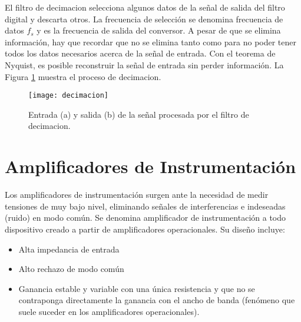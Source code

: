 El filtro de decimacion selecciona algunos datos de la señal de salida del filtro digital y descarta otros. La frecuencia de selección se denomina frecuencia de datos $f_s$ y es la frecuencia de salida del conversor. A pesar de que se elimina información, hay que recordar que no se elimina tanto como para no poder tener todos los datos necesarios acerca de la señal de entrada. Con el teorema de Nyquist\cite{shannon}, es posible reconstruir la señal de entrada sin perder información. La Figura \ref{fig:decimacion} muestra el proceso de decimacion.\cite{delta_sigma_2} %

\begin{figure}[h]
  \centering
  \texttt{[image: decimacion]}
  \caption{Entrada (a) y salida (b) de la señal procesada por el filtro de decimacion. }\label{fig:decimacion}
\end{figure} 




\section{Amplificadores de Instrumentación} %
\label{sec:amplificadores_de_instrumentacion}


Los amplificadores de instrumentación surgen ante la necesidad de medir tensiones de muy bajo nivel, eliminando señales de interferencias e indeseadas (ruido) en modo común.
Se denomina amplificador de instrumentación a todo dispositivo creado a partir de amplificadores operacionales. Su diseño incluye:

\begin{itemize}
  \item Alta impedancia de entrada
    \item Alto rechazo de modo común
    \item Ganancia estable y variable con una única resistencia y que no se contraponga directamente la ganancia con el ancho de banda (fenómeno que suele suceder en los amplificadores operacionales).
\end{itemize}

